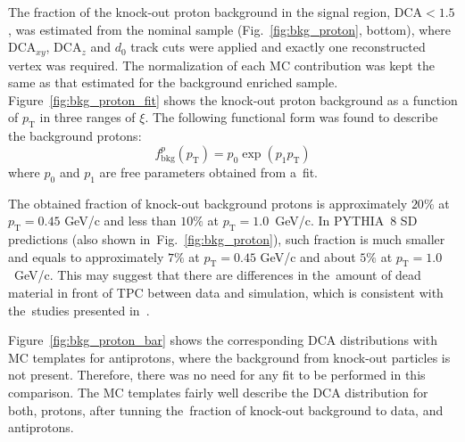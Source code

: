 The fraction of the knock-out proton background in the signal region, $\textrm{DCA}<1.5$, was estimated from the nominal sample (Fig.~\ref{fig:bkg_proton}, bottom), where $\textrm{DCA}_{xy}$, $\textrm{DCA}_z$ and $d_0$ track cuts were applied and exactly one reconstructed vertex was required. The normalization of each MC contribution was kept the same as that estimated for the background enriched sample. Figure~\ref{fig:bkg_proton_fit} shows the knock-out proton background as a function of $p_\textrm{T}$ in three ranges of $\xi$. The following functional form was found to describe the
background protons:
\begin{equation}
f_{\textrm{bkg}}^{p}\left(p_\textrm{T}\right) = p_0\exp\left(p_1p_\textrm{T}\right)
\label{eq:protonBkgParametrization}
\end{equation}
where  $p_0$ and $p_1$ are  free parameters obtained from a~fit. 

The obtained fraction of knock-out background protons is approximately $20\%$ at $p_\textrm{T} = 0.45$ GeV/c
 and less than $10\%$ at $p_\textrm{T} = 1.0$~GeV/c.
 In PYTHIA~8 SD   predictions (also shown in~Fig.~\ref{fig:bkg_proton}), such fraction is much smaller  and equals to approximately $7\%$ at $p_\textrm{T} = 0.45$ GeV/c
 and about $5\%$ at $p_\textrm{T} = 1.0$~GeV/c. This may suggest that there are differences in the~amount of dead material in front of TPC  between data and simulation, which is consistent with the~studies presented in~\cite{supplementaryNote}.
 
 
 Figure~\ref{fig:bkg_proton_bar} shows the corresponding $\textrm{DCA}$ distributions with MC templates for antiprotons, where the background from knock-out particles is not present. Therefore, there was no need for any fit to be performed in this comparison. The MC templates  fairly well describe the $\textrm{DCA}$ distribution for both, protons, after tunning the~fraction of knock-out background to data, and antiprotons. %
 


